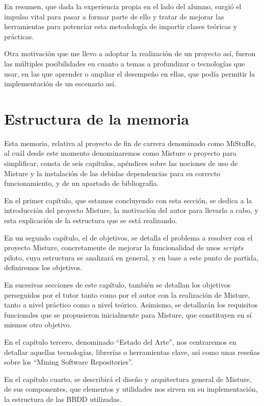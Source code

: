 En resumen, que dada la experiencia propia en el lado del alumno, surgió el impulso vital para pasar a formar parte de ello y tratar de mejorar las herramientas para potenciar esta metodología de impartir clases teóricas y prácticas.


Otra motivación que me llevo a adoptar la realización de un proyecto así, fueron las múltiples posibilidades en cuanto a temas a profundizar o tecnologías que usar, en las que aprender o ampliar el desempeño en ellas, que podía permitir la implementación de un escenario así.


\section{Estructura de la memoria}

Esta memoria, relativa al proyecto de fin de carrera denominado como MiStuRe, al cuál desde este momento denominaremos como Misture o proyecto para simplificar, consta de seis capítulos, apéndices sobre las nociones de uso de Misture y la instalación de las debidas dependencias para su correcto funcionamiento, y de un apartado de bibliografía.


En el primer capítulo, que estamos concluyendo con esta sección, se dedica a la introducción del proyecto Misture, la motivación del autor para llevarlo a cabo, y esta explicación de la estructura que se está realizando.


En un segundo capítulo, el de objetivos, se detalla el problema a resolver con el proyecto Misture, concretamente de mejorar la funcionalidad de unos \textit{scripts} piloto, cuya estructura se analizará en general, y en base a este punto de partida, definiremos los objetivos.


En sucesivas secciones de este capítulo, también se detallan los objetivos perseguidos por el tutor tanto como por el autor con la realización de Misture, tanto a nivel práctico como a nivel teórico. Asimismo, se detallarán los requisitos funcionales que se propusieron inicialmente para Misture, que constituyen en sí mismos otro objetivo.


En el capítulo tercero, denominado ``Estado del Arte'', nos centraremos en detallar aquellas tecnologías, librerías o herramientas clave, así como unas reseñas sobre los ``Mining Software Repositories''.


En el capítulo cuarto, se describirá el diseño y arquitectura general de Misture, de sus componentes, que elementos y utilidades nos sirven en su implementación, la estructura de las BBDD utilizadas.


